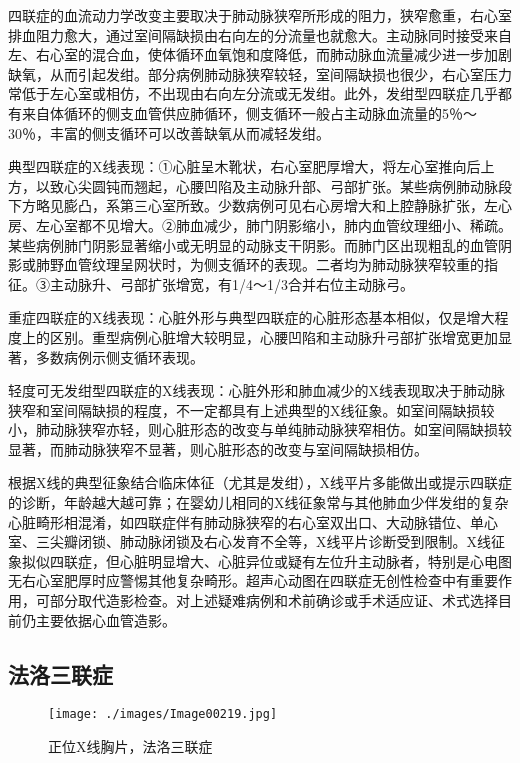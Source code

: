 四联症的血流动力学改变主要取决于肺动脉狭窄所形成的阻力，狭窄愈重，右心室排血阻力愈大，通过室间隔缺损由右向左的分流量也就愈大。主动脉同时接受来自左、右心室的混合血，使体循环血氧饱和度降低，而肺动脉血流量减少进一步加剧缺氧，从而引起发绀。部分病例肺动脉狭窄较轻，室间隔缺损也很少，右心室压力常低于左心室或相仿，不出现由右向左分流或无发绀。此外，发绀型四联症几乎都有来自体循环的侧支血管供应肺循环，侧支循环一般占主动脉血流量的5％～30％，丰富的侧支循环可以改善缺氧从而减轻发绀。

典型四联症的X线表现：①心脏呈木靴状，右心室肥厚增大，将左心室推向后上方，以致心尖圆钝而翘起，心腰凹陷及主动脉升部、弓部扩张。某些病例肺动脉段下方略见膨凸，系第三心室所致。少数病例可见右心房增大和上腔静脉扩张，左心房、左心室都不见增大。②肺血减少，肺门阴影缩小，肺内血管纹理细小、稀疏。某些病例肺门阴影显著缩小或无明显的动脉支干阴影。而肺门区出现粗乱的血管阴影或肺野血管纹理呈网状时，为侧支循环的表现。二者均为肺动脉狭窄较重的指征。③主动脉升、弓部扩张增宽，有1/4～1/3合并右位主动脉弓。

重症四联症的X线表现：心脏外形与典型四联症的心脏形态基本相似，仅是增大程度上的区别。重型病例心脏增大较明显，心腰凹陷和主动脉升弓部扩张增宽更加显著，多数病例示侧支循环表现。

轻度可无发绀型四联症的X线表现：心脏外形和肺血减少的X线表现取决于肺动脉狭窄和室间隔缺损的程度，不一定都具有上述典型的X线征象。如室间隔缺损较小，肺动脉狭窄亦轻，则心脏形态的改变与单纯肺动脉狭窄相仿。如室间隔缺损较显著，而肺动脉狭窄不显著，则心脏形态的改变与室间隔缺损相仿。

根据X线的典型征象结合临床体征（尤其是发绀），X线平片多能做出或提示四联症的诊断，年龄越大越可靠；在婴幼儿相同的X线征象常与其他肺血少伴发绀的复杂心脏畸形相混淆，如四联症伴有肺动脉狭窄的右心室双出口、大动脉错位、单心室、三尖瓣闭锁、肺动脉闭锁及右心发育不全等，X线平片诊断受到限制。X线征象拟似四联症，但心脏明显增大、心脏异位或疑有左位升主动脉者，特别是心电图无右心室肥厚时应警惕其他复杂畸形。超声心动图在四联症无创性检查中有重要作用，可部分取代造影检查。对上述疑难病例和术前确诊或手术适应证、术式选择目前仍主要依据心血管造影。

\subsection{法洛三联症}

\begin{figure}[!htbp]
 \centering
 \texttt{[image: ./images/Image00219.jpg]}
 \captionsetup{justification=centering}
 \caption{正位X线胸片，法洛三联症}
 \label{fig4-2-6}
  \end{figure} 

